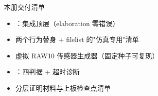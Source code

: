 \begin{okbox}{本册交付清单}
\begin{itemize}
  \item {}：集成顶层（elaboration 零错误）
  \item 两个行为替身 + filelist 的"仿真专用"清单
  \item 虚拟 RAW10 传感器生成器（固定种子可复现）
  \item {}：四判据 + 超时诊断
  \item 分层证明材料与上板检查点清单
\end{itemize}
\end{okbox}
